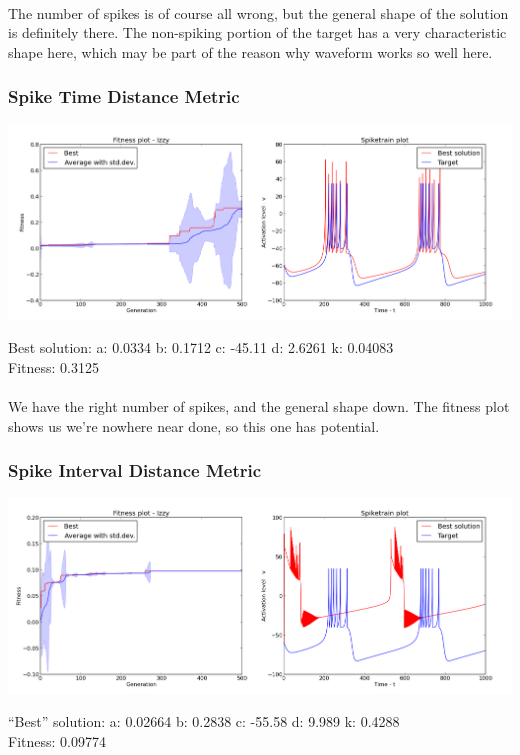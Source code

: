 \documentclass[a4paper,12pt]{article}
\begin{document}
\paragraph{}The number of spikes is of course all wrong, but the general shape of the solution is definitely there. The non-spiking portion of the target has a very characteristic shape here, which may be part of the reason why waveform works so well here.

\subsubsection{Spike Time Distance Metric}
\centerline{\includegraphics[width=1.0\textwidth]{img/case3_time}}
Best solution: 
a: 0.0334 
b: 0.1712 
c: -45.11 
d: 2.6261 
k: 0.04083 \\
Fitness: 0.3125
\paragraph{}We have the right number of spikes, and the general shape down. The fitness plot shows us we're nowhere near done, so this one has potential.

\subsubsection{Spike Interval Distance Metric}
\centerline{\includegraphics[width=1.0\textwidth]{img/case3_int}}
``Best'' solution: 
a: 0.02664 
b: 0.2838 
c: -55.58 
d: 9.989 
k: 0.4288 \\
Fitness: 0.09774
\end{document}
